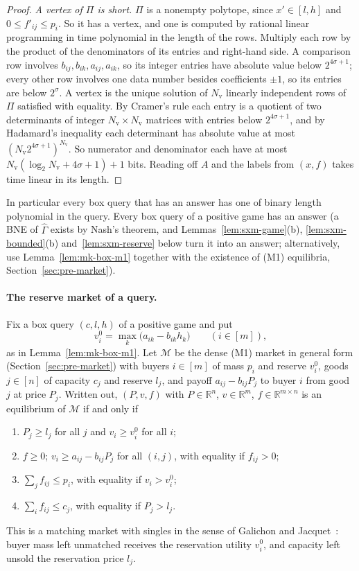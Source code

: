 \begin{proof}
\emph{A vertex of $\Pi$ is short.} $\Pi$ is a nonempty polytope, since $x'\in[l,h]$ and
$0\le f'_{ij}\le p_i$. So it has a vertex, and one is computed by rational linear programming in time
polynomial in the length of the rows. Multiply each row by the product of the denominators of its
entries and right-hand side. A comparison row involves $b_{ij},b_{ik},a_{ij},a_{ik}$, so its integer entries
have absolute value below $2^{4\sigma+1}$; every other row involves one data number besides
coefficients $\pm1$, so its entries are below $2^{\sigma}$. A vertex is the unique solution of
$N_{\mathrm v}$ linearly independent rows of $\Pi$ satisfied with equality. By Cramer's rule each entry
is a quotient of two determinants of integer $N_{\mathrm v}\times N_{\mathrm v}$ matrices with entries
below $2^{4\sigma+1}$, and by Hadamard's inequality each determinant has absolute value at most
$(N_{\mathrm v}2^{4\sigma+1})^{N_{\mathrm v}}$. So numerator and denominator each have at most
$N_{\mathrm v}(\log_2N_{\mathrm v}+4\sigma+1)+1$ bits. Reading off $A$ and the labels from $(x,f)$ takes
time linear in its length.
\end{proof}

In particular every box query that has an answer has one of binary length polynomial in the query.
Every box query of a positive game has an answer (a BNE of $\widehat\Gamma$ exists by Nash's theorem,
and Lemmas~\ref{lem:sxm-game}(b), \ref{lem:sxm-bounded}(b) and~\ref{lem:sxm-reserve} below turn it into
an answer; alternatively, use Lemma~\ref{lem:mk-box-m1} together with the existence of (M1) equilibria,
Section~\ref{sec:pre-market}).

\paragraph{The reserve market of a query.} Fix a box query $(c,l,h)$ of a positive game and put
\[
v_i^0=\max_k\bigl(a_{ik}-b_{ik}h_k\bigr)\qquad(i\in[m]),
\]
as in Lemma~\ref{lem:mk-box-m1}. Let $\mathcal M$ be the dense (M1) market in general form
(Section~\ref{sec:pre-market}) with buyers $i\in[m]$ of mass $p_i$ and reserve $v_i^0$, goods $j\in[n]$
of capacity $c_j$ and reserve $l_j$, and payoff $a_{ij}-b_{ij}P_j$ to buyer $i$ from good $j$ at price
$P_j$. Written out, $(P,v,f)$ with $P\in\mathbb R^n$, $v\in\mathbb R^m$, $f\in\mathbb R^{m\times n}$ is an
equilibrium of $\mathcal M$ if and only if
\begin{enumerate}[nosep,label=(R\arabic*)]
\item $P_j\ge l_j$ for all $j$ and $v_i\ge v_i^0$ for all $i$;
\item $f\ge0$; $v_i\ge a_{ij}-b_{ij}P_j$ for all $(i,j)$, with equality if $f_{ij}>0$;
\item $\sum_jf_{ij}\le p_i$, with equality if $v_i>v_i^0$;
\item $\sum_if_{ij}\le c_j$, with equality if $P_j>l_j$.
\end{enumerate}
This is a matching market with singles in the sense of Galichon and Jacquet~\cite{galichon25}: buyer
mass left unmatched receives the reservation utility $v_i^0$, and capacity left unsold the reservation
price $l_j$.

